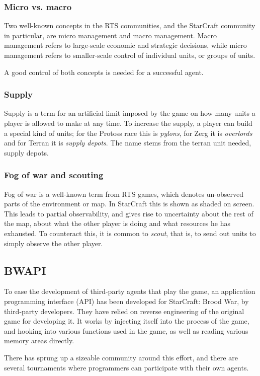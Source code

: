 \subsubsection{Micro vs. macro}
Two well-known concepts in the RTS communities, and the StarCraft community in particular, are micro management and macro management. Macro management refers to large-scale economic and strategic decisions, while micro management refers to smaller-scale control of individual units, or groups of units.

A good control of both concepts is needed for a successful agent.

\subsubsection{Supply}
Supply is a term for an artificial limit imposed by the game on how many units a player is allowed to make at any time. To increase the supply, a player can build a special kind of units; for the Protoss race this is {\em pylons}, for Zerg it is {\em overlords} and for Terran it is {\em supply depots}. The name stems from the terran unit needed, supply depots.

\subsubsection{Fog of war and scouting}
Fog of war is a well-known term from RTS games, which denotes un-observed parts of the environment or map. In StarCraft this is shown as shaded on screen. This leads to partial observability, and gives rise to uncertainty about the rest of the map, about what the other player is doing and what resources he has exhausted. To counteract this, it is common to {\em scout}, that is, to send out units to simply observe the other player.

\subsection{BWAPI}
To ease the development of third-party agents that play the game, an application programming interface (API) has been developed for StarCraft: Brood War, by third-party developers. They have relied on reverse engineering of the original game for developing it. It works by injecting itself into the process of the game, and hooking into various functions used in the game, as well as reading various memory areas directly.\cite{bwapi}

There has sprung up a sizeable community around this effort, and there are several tournaments where programmers can participate with their own agents.\cite{bwapi}

